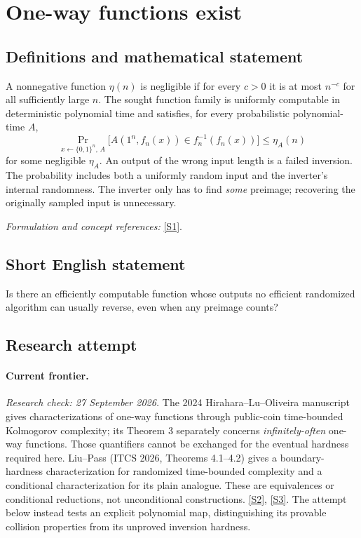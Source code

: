 \documentclass[11pt,a4paper]{article}
\newcommand{\sref}[2]{\hyperlink{source:#1:#2}{[S#2]}}
\newif\ifshowcatalogue
\newcommand{\cataloguescope}[1]{\ifshowcatalogue
 \paragraph{Exact scope in the supplied catalogue.}
 \begin{quote}\small #1\end{quote}\fi}
\begin{document}
\setcounter{section}{0}
\clearpage
\section*{\texorpdfstring{One-way functions exist}{One-way functions exist}}\label{statement}
\subsection{Definitions and mathematical statement}
A nonnegative function $\eta(n)$ is negligible if for every $c>0$ it is at most $n^{-c}$ for all sufficiently large $n$. The sought function family is uniformly computable in deterministic polynomial time and satisfies, for every probabilistic polynomial-time $A$,
\[
 \Pr_{x\leftarrow\{0,1\}^n,\,A}\!\bigl[A(1^n,f_n(x))\in f_n^{-1}(f_n(x))\bigr]
 \le \eta_A(n)
\]
for some negligible $\eta_A$. An output of the wrong input length is a failed inversion. The probability includes both a uniformly random input and the inverter's internal randomness. The inverter only has to find \emph{some} preimage; recovering the originally sampled input is unnecessary.
\par\smallskip\textit{Formulation and concept references:} \sref{statement}{1}.
\cataloguescope{Prove or disprove that there exists a deterministic polynomial-time computable function family f\_n:\{0,1\}\textasciicircum{}n->\{0,1\}\textasciicircum{}\{poly(n)\} such that every probabilistic polynomial-time algorithm inverts f\_n on a uniformly random input with only negligible probability.}
\subsection{Short English statement}
Is there an efficiently computable function whose outputs no efficient randomized algorithm can usually reverse, even when any preimage counts?
\subsection{Research attempt}
\paragraph{Current frontier.}
\textit{Research check: 27 September 2026.}
The 2024 Hirahara--Lu--Oliveira manuscript gives characterizations of
one-way functions through public-coin time-bounded Kolmogorov complexity;
its Theorem 3 separately concerns \emph{infinitely-often} one-way
functions. Those quantifiers cannot be exchanged for the eventual
hardness required here. Liu--Pass (ITCS 2026, Theorems 4.1--4.2) gives a
boundary-hardness characterization for randomized time-bounded
complexity and a conditional characterization for its plain analogue.
These are equivalences or conditional reductions, not unconditional
constructions. \sref{statement}{2}, \sref{statement}{3}.
The attempt below instead tests an explicit polynomial map, distinguishing
its provable collision properties from its unproved inversion hardness.
\end{document}
